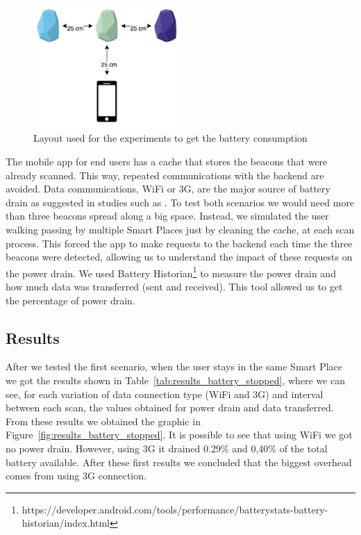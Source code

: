 \begin{figure}[!ht]
  \centering
    \includegraphics[width=0.5\textwidth, keepaspectratio]{images/experiments_battery_layout}
    \caption[Layout for experiments of battery consumption]{Layout used for the experiments to get the battery consumption}
    \label{fig:layout_experiments_battery_consumption}
\end{figure}

The mobile app for end users has a cache that stores the beacons that were already scanned.
This way, repeated communications with the backend are avoided.
Data communications, \gls{WiFi} or \gls{3G}, are the major source of battery drain as suggested in studies such as \cite{energy}.
To test both scenarios we would need more than three beacons spread along a big space.
Instead, we simulated the user walking passing by multiple Smart Places just by cleaning the cache, at each scan process.
This forced the app to make requests to the backend each time the three beacons were detected, allowing us to understand the impact of these requests on the power drain.
We used Battery Historian\footnote{https://developer.android.com/tools/performance/batterystats-battery-historian/index.html} to measure the power drain and how much data was transferred (sent and received). This tool allowed us to get the percentage of power drain.

\subsection{Results}
\label{sub:evaluation_energy_consumption_results}
After we tested the first scenario, when the user stays in the same Smart Place we got the results shown in Table~\ref{tab:results_battery_stopped}, where we can see, for each variation of data connection type (\gls{WiFi} and \gls{3G}) and interval between each scan, the values obtained for power drain and data transferred.
From these results we obtained the graphic in Figure~\ref{fig:results_battery_stopped}.
It is possible to see that using \gls{WiFi} we got no power drain.
However, using \gls{3G} it drained 0.29\% and 0,40\% of the total battery available.
After these first results we concluded that the biggest overhead comes from using \gls{3G} connection.

